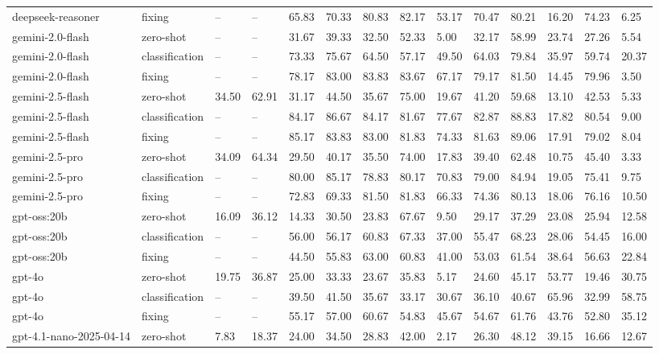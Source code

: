 \begin{table}[!t]
\begin{tabular}{llllllllllllll}
deepseek-reasoner & fixing & -- & -- & 65.83 & 70.33 & 80.83 & 82.17 & 53.17 & 70.47 & 80.21 & 16.20 & 74.23 & 6.25 \\
gemini-2.0-flash & zero-shot & -- & -- & 31.67 & 39.33 & 32.50 & 52.33 & 5.00 & 32.17 & 58.99 & 23.74 & 27.26 & 5.54 \\
gemini-2.0-flash & classification & -- & -- & 73.33 & 75.67 & 64.50 & 57.17 & 49.50 & 64.03 & 79.84 & 35.97 & 59.74 & 20.37 \\
gemini-2.0-flash & fixing & -- & -- & 78.17 & 83.00 & 83.83 & 83.67 & 67.17 & 79.17 & 81.50 & 14.45 & 79.96 & 3.50 \\
gemini-2.5-flash & zero-shot & 34.50 & 62.91 & 31.17 & 44.50 & 35.67 & 75.00 & 19.67 & 41.20 & 59.68 & 13.10 & 42.53 & 5.33 \\
gemini-2.5-flash & classification & -- & -- & 84.17 & 86.67 & 84.17 & 81.67 & 77.67 & 82.87 & 88.83 & 17.82 & 80.54 & 9.00 \\
gemini-2.5-flash & fixing & -- & -- & 85.17 & 83.83 & 83.00 & 81.83 & 74.33 & 81.63 & 89.06 & 17.91 & 79.02 & 8.04 \\
gemini-2.5-pro & zero-shot & 34.09 & 64.34 & 29.50 & 40.17 & 35.50 & 74.00 & 17.83 & 39.40 & 62.48 & 10.75 & 45.40 & 3.33 \\
gemini-2.5-pro & classification & -- & -- & 80.00 & 85.17 & 78.83 & 80.17 & 70.83 & 79.00 & 84.94 & 19.05 & 75.41 & 9.75 \\
gemini-2.5-pro & fixing & -- & -- & 72.83 & 69.33 & 81.50 & 81.83 & 66.33 & 74.36 & 80.13 & 18.06 & 76.16 & 10.50 \\
gpt-oss:20b & zero-shot & 16.09 & 36.12 & 14.33 & 30.50 & 23.83 & 67.67 & 9.50 & 29.17 & 37.29 & 23.08 & 25.94 & 12.58 \\
gpt-oss:20b & classification & -- & -- & 56.00 & 56.17 & 60.83 & 67.33 & 37.00 & 55.47 & 68.23 & 28.06 & 54.45 & 16.00 \\
gpt-oss:20b & fixing & -- & -- & 44.50 & 55.83 & 63.00 & 60.83 & 41.00 & 53.03 & 61.54 & 38.64 & 56.63 & 22.84 \\
gpt-4o & zero-shot & 19.75 & 36.87 & 25.00 & 33.33 & 23.67 & 35.83 & 5.17 & 24.60 & 45.17 & 53.77 & 19.46 & 30.75 \\
gpt-4o & classification & -- & -- & 39.50 & 41.50 & 35.67 & 33.17 & 30.67 & 36.10 & 40.67 & 65.96 & 32.99 & 58.75 \\
gpt-4o & fixing & -- & -- & 55.17 & 57.00 & 60.67 & 54.83 & 45.67 & 54.67 & 61.76 & 43.76 & 52.80 & 35.12 \\
gpt-4.1-nano-2025-04-14 & zero-shot & 7.83 & 18.37 & 24.00 & 34.50 & 28.83 & 42.00 & 2.17 & 26.30 & 48.12 & 39.15 & 16.66 & 12.67 \\

\end{tabular}
\end{table}
